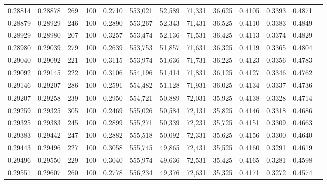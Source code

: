 \begin{tabular}{rrrrrrrrrrrrr}
0.28814 & 0.28878 &   269 & 100 &                                     0.2710 & 553,021 &  52,589 &  71,331 &  36,625 & 0.4105 & 0.3393 & 0.4871 \\
0.28879 & 0.28929 &   246 & 100 &                                     0.2890 & 553,267 &  52,343 &  71,431 &  36,525 & 0.4110 & 0.3383 & 0.4849 \\
0.28929 & 0.28980 &   207 & 100 &                                     0.3257 & 553,474 &  52,136 &  71,531 &  36,425 & 0.4113 & 0.3374 & 0.4829 \\
0.28980 & 0.29039 &   279 & 100 &                                     0.2639 & 553,753 &  51,857 &  71,631 &  36,325 & 0.4119 & 0.3365 & 0.4804 \\
0.29040 & 0.29092 &   221 & 100 &                                     0.3115 & 553,974 &  51,636 &  71,731 &  36,225 & 0.4123 & 0.3356 & 0.4783 \\
0.29092 & 0.29145 &   222 & 100 &                                     0.3106 & 554,196 &  51,414 &  71,831 &  36,125 & 0.4127 & 0.3346 & 0.4762 \\
0.29146 & 0.29207 &   286 & 100 &                                     0.2591 & 554,482 &  51,128 &  71,931 &  36,025 & 0.4134 & 0.3337 & 0.4736 \\
0.29207 & 0.29258 &   239 & 100 &                                     0.2950 & 554,721 &  50,889 &  72,031 &  35,925 & 0.4138 & 0.3328 & 0.4714 \\
0.29259 & 0.29325 &   305 & 100 &                                     0.2469 & 555,026 &  50,584 &  72,131 &  35,825 & 0.4146 & 0.3318 & 0.4686 \\
0.29325 & 0.29383 &   245 & 100 &                                     0.2899 & 555,271 &  50,339 &  72,231 &  35,725 & 0.4151 & 0.3309 & 0.4663 \\
0.29383 & 0.29442 &   247 & 100 &                                     0.2882 & 555,518 &  50,092 &  72,331 &  35,625 & 0.4156 & 0.3300 & 0.4640 \\
0.29443 & 0.29496 &   227 & 100 &                                     0.3058 & 555,745 &  49,865 &  72,431 &  35,525 & 0.4160 & 0.3291 & 0.4619 \\
0.29496 & 0.29550 &   229 & 100 &                                     0.3040 & 555,974 &  49,636 &  72,531 &  35,425 & 0.4165 & 0.3281 & 0.4598 \\
0.29551 & 0.29607 &   260 & 100 &                                     0.2778 & 556,234 &  49,376 &  72,631 &  35,325 & 0.4171 & 0.3272 & 0.4574 \\

\end{tabular}
